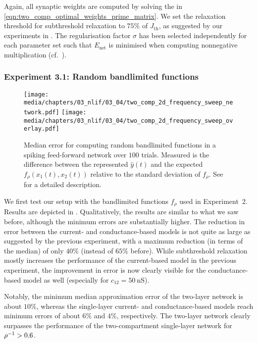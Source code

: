 Again, all synaptic weights are computed by solving the \QP in \cref{eqn:two_comp_optimal_weights_prime_matrix}.
We set the relaxation threshold for subthreshold relaxation to $75\%$ of $J_\mathrm{th}$, as suggested by our experiments in .
The regularisation factor $\sigma$ has been selected independently for each parameter set such that $E_\mathrm{net}$ is minimised when computing nonnegative multiplication (cf.~).

\subsubsection{Experiment 3.1: Random bandlimited functions}

\begin{figure}[t]
	\centering
	{\texttt{[image: media/chapters/03\_nlif/03\_04/two\_comp\_2d\_frequency\_sweep\_network.pdf]}}%
	\kern-158.06mm\texttt{[image: media/chapters/03\_nlif/03\_04/two\_comp\_2d\_frequency\_sweep\_overlay.pdf]}
	\caption[Median error for computing random bandlimited functions in a feed-forward network over 100 trials]{Median error for computing random bandlimited functions in a spiking feed-forward network over $100$ trials. Measured \NRMSE is the difference between the represented $\hat y(t)$ and the expected $f_\rho(x_1(t), x_2(t))$ relative to the standard deviation of $f_\rho$. See  for a detailed description.}
	\label{fig:frequency_sweep_network}
\end{figure}

We first test our setup with the bandlimited functions $f_\rho$ used in Experiment~2.
Results are depicted in .
Qualitatively, the results are similar to what we saw before, although the minimum errors are substantially higher.
The reduction in error between the current- and conductance-based models is not quite as large as suggested by the previous experiment, with a maximum reduction (in terms of the median) of only $40\%$ (instead of $65\%$ before).
While subthreshold relaxation mostly increases the performance of the current-based model in the previous experiment, the improvement in error is now clearly visible for the conductance-based model as well (especially for $c_{12} = \SI{50}{\nano\siemens}$).

Notably, the minimum median approximation error of the two-layer network is about $10\%$, whereas the single-layer current- and conductance-based models reach minimum errors of about $6\%$ and $4\%$, respectively. The two-layer network clearly surpasses the performance of the two-compartment \LIF single-layer network for ${\rho^{-1}} > 0.6$.

